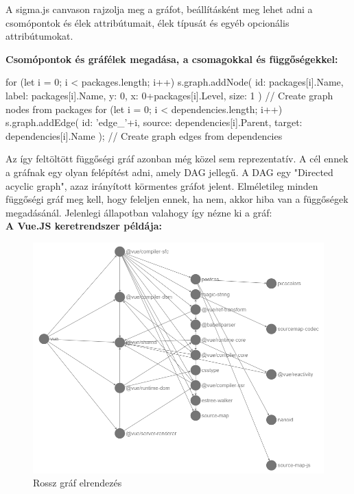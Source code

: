 A sigma.js canvason rajzolja meg a gráfot, beállításként meg lehet adni a csomópontok és élek attribútumait, élek típusát és egyéb opcionális attribútumokat.

\pagebreak

\textbf{Csomópontok és gráfélek megadása, a csomagokkal és függőségekkel:}

\begin{cpp}
for (let i = 0; i < packages.length; i++) { 
	s.graph.addNode({
		id: packages[i].Name,
		label: packages[i].Name,
		y: 0,
		x: 0+packages[i].Level,
		size: 1
	})        
}// Create graph nodes from packages
for (let i = 0; i < dependencies.length; i++) {
	s.graph.addEdge({
		id: 'edge_'+i,
		source: dependencies[i].Parent,
		target: dependencies[i].Name
	});
} // Create graph edges from dependencies
\end{cpp}

Az így feltöltött függőségi gráf azonban még közel sem reprezentatív. A cél ennek a gráfnak egy olyan felépítést adni, amely DAG jellegű. A DAG egy "Directed acyclic graph", azaz irányított körmentes gráfot jelent. Elméletileg minden függőségi gráf meg kell, hogy feleljen ennek, ha nem, akkor hiba van a függőségek megadásánál. Jelenlegi állapotban valahogy így nézne ki a gráf:\\

\textbf{A Vue.JS keretrendszer példája:}

\begin{figure}[!h]
	\centering
	\includegraphics[scale=0.4]{images/graph_wrong.png}
	\caption{Rossz gráf elrendezés}
	\label{fig:graph_wrong}
\end{figure}

